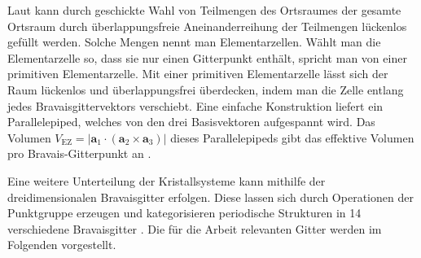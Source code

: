 Laut  kann durch geschickte Wahl von Teilmengen des Ortsraumes der gesamte Ortsraum durch
überlappungsfreie Aneinanderreihung der Teilmengen lückenlos gefüllt werden.
Solche Mengen nennt man Elementarzellen.
Wählt man die Elementarzelle so, dass sie nur einen Gitterpunkt enthält, spricht man von einer primitiven
Elementarzelle.
Mit einer primitiven Elementarzelle lässt sich der Raum lückenlos und überlappungsfrei überdecken, indem man die Zelle
entlang jedes Bravaisgittervektors verschiebt.
Eine einfache Konstruktion liefert ein Parallelepiped, welches von den drei Basisvektoren aufgespannt wird.
Das Volumen $V_\mathrm{EZ}= \lvert \mathbf{a}_1 \cdot (\mathbf{a}_2 \times  \mathbf{a}_3) \rvert$ dieses
Parallelepipeds gibt das effektive Volumen pro Bravais-Gitterpunkt an \autocite{Ashcroft}.


Eine weitere Unterteilung der Kristallsysteme kann mithilfe der dreidimensionalen Bravaisgitter erfolgen.
Diese lassen sich durch Operationen der Punktgruppe erzeugen und kategorisieren periodische Strukturen
in 14 verschiedene Bravaisgitter \autocite{Grundmann}.
Die für die Arbeit relevanten Gitter werden im Folgenden vorgestellt.

